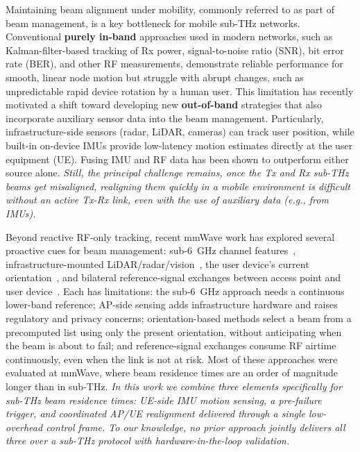 \documentclass[fleqn,10pt]{wlscirep}
\begin{document}
Maintaining beam alignment under mobility, commonly referred to as part of beam management, is a key bottleneck for mobile sub-THz networks\cite{Giordani2018ATO, 10422712, Wang2022}. Conventional \textbf{purely in-band} approaches used in modern networks, such as Kalman-filter-based tracking of Rx power, signal-to-noise ratio (SNR), bit error rate (BER), and other RF measurements\cite{8455289,9145366,10067030, 10123123}, demonstrate reliable performance for smooth, linear node motion but struggle with abrupt changes, such as unpredictable rapid device rotation by a human user\cite{Wang2022}. This limitation has recently motivated a shift toward developing new \textbf{out-of-band} strategies that also incorporate auxiliary sensor data into the beam management\cite{10494372, Azari2022, Nokia2022, Chen2023, Jornet2023}. Particularly, infrastructure-side sensors (radar, LiDAR, cameras) can track user position\cite{10422712,5GPPP_Automotive_Vision_2015}, while built-in on-device IMUs provide low-latency motion estimates directly at the user equipment (UE). Fusing IMU and RF data has been shown to outperform either source alone\cite{10036372,9391649,electronics8020142, s21082723, 9814507}. \emph{Still, the principal challenge remains, once the Tx and Rx sub-THz beams get misaligned, realigning them quickly in a mobile environment is difficult without an active Tx-Rx link, even with the use of auxiliary data (e.g., from IMUs).}

Beyond reactive RF-only tracking, recent mmWave work has explored several proactive cues for beam management: sub-6~GHz channel features~\cite{Alrabeiah2020DeepLearning}, infrastructure-mounted LiDAR/radar/vision~\cite{Alkhateeb2023DeepSense, Jiang2023LiDAR, Morais2023Position}, the user device's current orientation~\cite{Rezaie2022Orientation, Struye2023CoVRage}, and bilateral reference-signal exchanges between access point and user device~\cite{Alkhateeb2018DLCB, Xue2023Standardization, Heng2021SixChallenges}. Each has limitations: the sub-6~GHz approach needs a continuous lower-band reference; AP-side sensing adds infrastructure hardware and raises regulatory and privacy concerns; orientation-based methods select a beam from a precomputed list using only the present orientation, without anticipating when the beam is about to fail; and reference-signal exchanges consume RF airtime continuously, even when the link is not at risk. Most of these approaches were evaluated at mmWave, where beam residence times are an order of magnitude longer than in sub-THz. \emph{In this work we combine three elements specifically for sub-THz beam residence times: UE-side IMU motion sensing, a pre-failure trigger, and coordinated AP/UE realignment delivered through a single low-overhead control frame. To our knowledge, no prior approach jointly delivers all three over a sub-THz protocol with hardware-in-the-loop validation.}
\end{document}
